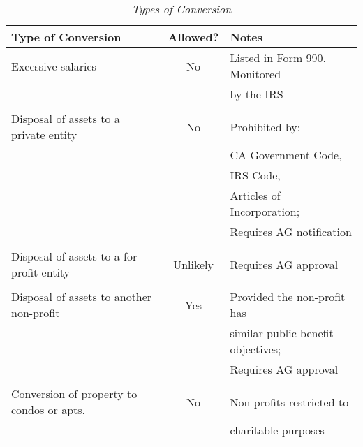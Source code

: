 \begin{table}[ht]
  \caption[Types of Conversion]{\textit{Types of Conversion}}%
  \label{tab:types_conversion}
  \begin{tabularx}{\textwidth}{lcl}
    \toprule
    \textbf{Type of Conversion}               & \mbox{\textbf{Allowed?}} & \textbf{Notes}                                                                                                          \\
    \midrule
    Excessive salaries                        & No                       & Listed in Form 990. Monitored\\
                                              & & by the IRS\\\\
    Disposal of assets to a private entity    & No                       & Prohibited by:\\
                                                                       & & CA Government Code, \\
                                                                       & & IRS Code, \\
                                              & & Articles of Incorporation;\\
                                              & & Requires AG notification \\\\
    Disposal of assets to a for-profit entity & Unlikely                 & Requires AG approval\\\\
    Disposal of assets to another non-profit  & Yes                      & Provided the non-profit has\\
                                              & & similar public benefit objectives;\\
                                              & & Requires AG approval\\\\
    Conversion of property to condos or apts. & No                       & Non-profits restricted to\\
                                              & & charitable purposes\\
    \bottomrule
  \end{tabularx}
\end{table}
\vspace{\baselineskip}

